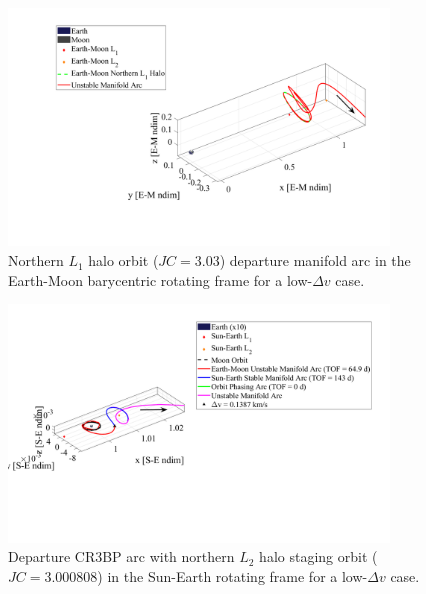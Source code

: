 \begin{figure}[H]
    \centering
    \includegraphics[width=0.9\textwidth]{figures/StagedMinDvEM.pdf}
    \caption{Northern $L_{1}$ halo orbit ($JC=3.03$) departure manifold arc in the Earth-Moon barycentric rotating frame for a low-$\Delta v$ case.}
    \label{fig:stagedMinDvEM}
\end{figure}

\begin{figure}[H]
    \centering
    \includegraphics[width=0.9\textwidth]{figures/StagedMinDvSE.pdf}
    \caption{Departure CR3BP arc with northern $L_{2}$ halo staging orbit ($JC=3.000808$) in the Sun-Earth rotating frame for a low-$\Delta v$ case.}
    \label{fig:stagedMinDvSE}
\end{figure}

